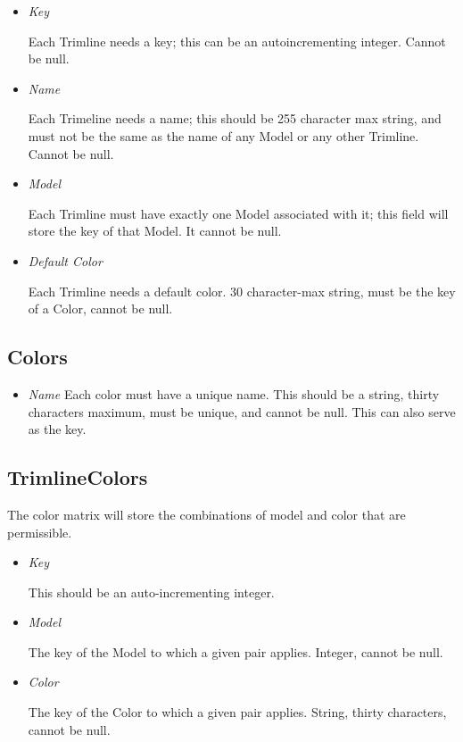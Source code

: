 \documentclass[11pt,letterpaper,oneside]{amsart}
\begin{document}
\begin{itemize}
	\item \emph{Key}
	
	Each Trimline needs a key; this can be an autoincrementing integer. Cannot be null.
	
	\item \emph{Name}
	
	Each Trimeline needs a name; this should be 255 character max string, and must not be the same as the name of any Model or any other Trimline.  Cannot be null.

	\item \emph{Model}
	
	Each Trimline must have exactly one Model associated with it; this field will store the key of that Model.  It cannot be null.
	
	\item \emph{Default Color}
	
	Each Trimline needs a default color.  30 character-max string, must be the key of a Color, cannot be null.

\end{itemize}

\subsection*{Colors}

\begin{itemize}
	\item \emph	{Name}
		Each color must have a unique name.  This should be a string, thirty characters maximum, must be unique, and cannot be null.  This can also serve as the key.
		
\end{itemize}

\subsection*{TrimlineColors}

The color matrix will store the combinations of model and color that are permissible.

\begin{itemize}

\item \emph{Key}

	This should be an auto-incrementing integer.
	
\item \emph{Model}

	The key of the Model to which a given pair applies.  Integer, cannot be null.
	
\item \emph{Color}

	The key of the Color to which a given pair applies. String, thirty characters, cannot be null.

\end{itemize}
\end{document}

